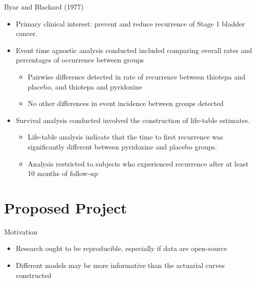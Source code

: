 \documentclass[
  ignorenonframetext,
]{beamer}
\providecommand{\tightlist}{%
  \setlength{\itemsep}{0pt}\setlength{\parskip}{0pt}}
\begin{document}
\begin{frame}{Byar and Blackard (1977)}
\protect\hypertarget{byar-and-blackard-1977}{}
\begin{itemize}
\tightlist
\item
  Primary clinical interest: prevent and reduce recurrence of Stage 1
  bladder cancer.
\item
  Event time agnostic analysis conducted included comparing overall
  rates and percentages of occurrence between groups

  \begin{itemize}
  \tightlist
  \item
    Pairwise difference detected in rate of recurrence between thiotepa
    and placebo, and thiotepa and pyridoxine
  \item
    No other differences in event incidence between groups detected
  \end{itemize}
\item
  Survival analysis conducted involved the construction of life-table
  estimates.

  \begin{itemize}
  \tightlist
  \item
    Life-table analysis indicate that the time to first recurrence was
    significantly different between pyridoxine and placebo groups.
  \item
    Analysis restricted to subjects who experienced recurrence after at
    least 10 months of follow-up
  \end{itemize}
\end{itemize}
\end{frame}

\hypertarget{proposed-project}{%
\section{Proposed Project}\label{proposed-project}}

\begin{frame}{Motivation}
\protect\hypertarget{motivation}{}
\begin{itemize}
\tightlist
\item
  Research ought to be reproducible, especially if data are open-source
\item
  Different models may be more informative than the actuarial curves
  constructed
\end{itemize}
\end{frame}
\end{document}
